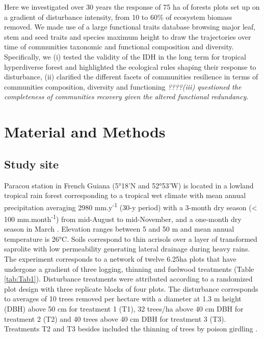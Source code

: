 \documentclass[fleqn,10pt]{ArtEcoFoG} %
\theoremstyle{definition}
\theoremstyle{definition}
\theoremstyle{definition}
\theoremstyle{remark}
\begin{document}
Here we investigated over 30 years the response of 75 ha of forests
plots set up on a gradient of disturbance intensity, from 10 to 60\% of
ecosystem biomass removed. We made use of a large functional traits
database browsing major leaf, stem and seed traits and species maximum
height to draw the trajectories over time of communities taxonomic and
functional composition and diversity. Specifically, we (i) tested the
validity of the IDH in the long term for tropical hyperdiverse forest
and highlighted the ecological rules shaping their response to
disturbance, (ii) clarified the different facets of communities
resilience in terms of communities composition, diversity and
functioning \emph{????(iii) questioned the completeness of communities
recovery given the altered functional redundancy.}

\section{Material and Methods}\label{material-and-methods}

\subsection{Study site}\label{study-site}

Paracou station in French Guiana (5°18'N and 52°53'W) is located in a
lowland tropical rain forest corresponding to a tropical wet climate
with mean annual precipitation averaging 2980 mm.y\textsuperscript{-1}
(30-y period) with a 3-month dry season (\textless{} 100
mm.month\textsuperscript{-1}) from mid-August to mid-November, and a
one-month dry season in March \citep{Wagner2011}. Elevation ranges
between 5 and 50 m and mean annual temperature is 26°C. Soils correspond
to thin acrisols over a layer of transformed saprolite with low
permeability generating lateral drainage during heavy rains. The
experiment corresponds to a network of twelve 6.25ha plots that have
undergone a gradient of three logging, thinning and fuelwood treatments
(Table \ref{tab:Tab1}). Disturbance treatments were attributed according
to a randomized plot design with three replicate blocks of four plots.
The disturbance corresponds to averages of 10 trees removed per hectare
with a diameter at 1.3 m height (DBH) above 50 cm for treatment 1 (T1),
32 trees/ha above 40 cm DBH for treatment 2 (T2) and 40 trees above 40
cm DBH for treatment 3 (T3). Treatments T2 and T3 besides included the
thinning of trees by poison girdling \citep{Blanc2009}.
\end{document}
